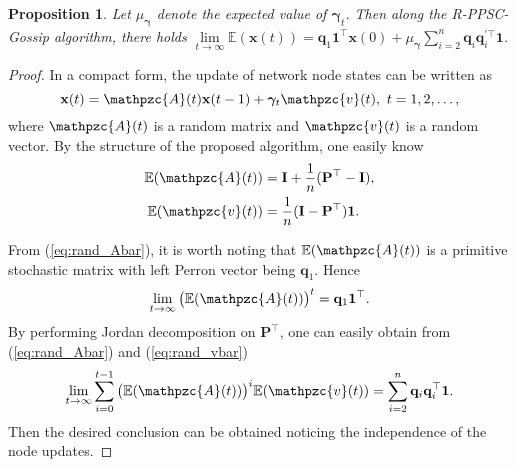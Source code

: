 \documentclass[a4paper, 11pt]{article}
\newcommand{\1}{\mathbf{1}}
\newcommand{\xb}{\mathbf{x}}
\newcommand{\Ib}{\mathbf{I}}
\newcommand{\Pb}{\mathbf{P}}
\newcommand{\qb}{\mathbf{q}}
\newcommand{\gammab}{{\bm \gamma}}
\newtheorem{proposition}{Proposition}
\begin{document}
\begin{proposition}\label{prop:mean_limit}
	Let $\mu_{\gammab}$ denote the expected value of $\gammab_t$. Then along the  R-PPSC-Gossip algorithm, there holds $\lim\limits_{t\to\infty}\mathbb{E}(\xb(t)) = \qb_1\1^\top\xb(0) + \mu_{\gammab}\sum\limits_{i=2}^n\qb_i\qb_i^{\prime\top}\1$.
\end{proposition}
\begin{proof}
	In a compact form, the update of network node states can be written as
	\begin{equation}\label{eq:rand_compact_form}
	\xb(t)=\mathpzc{A}(t)\xb(t-1) + \gammab_t\mathpzc{v}(t),\ t=1,2,\dots,
	\end{equation}
	where  $\mathpzc{A}(t)$  is a random matrix and $\mathpzc{v}(t)$ is a random vector.  By the structure of the proposed algorithm, one easily know
	\begin{align}
	\mathbb{E}(\mathpzc{A}(t)) &= \Ib + \frac{1}{n}(\Pb^\top-\Ib),\label{eq:rand_Abar}\\
	\mathbb{E}(\mathpzc{v}(t))  &= \frac{1}{n}(\Ib-\Pb^\top)\1. \label{eq:rand_vbar}
	\end{align}
	
	From (\ref{eq:rand_Abar}), it is worth noting that $\mathbb{E}(\mathpzc{A}(t))$ is a primitive stochastic matrix with left Perron vector being $\qb_1$. Hence \cite{horn1990matrix}
	\begin{equation}\label{eq:Abar_conv}
	\lim\limits_{t\to\infty}\big(\mathbb{E}(\mathpzc{A}(t))\big)^t=\qb_1\1^\top.
	\end{equation}
	By performing Jordan decomposition on $\Pb^\top$, one can easily obtain from (\ref{eq:rand_Abar}) and (\ref{eq:rand_vbar})
	\begin{equation}\label{eq:series_conv}
	\lim\limits_{t\to\infty}\sum\limits_{i=0}^{t-1}\big(\mathbb{E}(\mathpzc{A}(t))\big)^i \mathbb{E}(\mathpzc{v}(t))=\sum\limits_{i=2}^n\qb_i\qb_i^\top\1.
	\end{equation}
	Then the desired  conclusion can be obtained noticing the independence of the node updates.
\end{proof}
\end{document}
